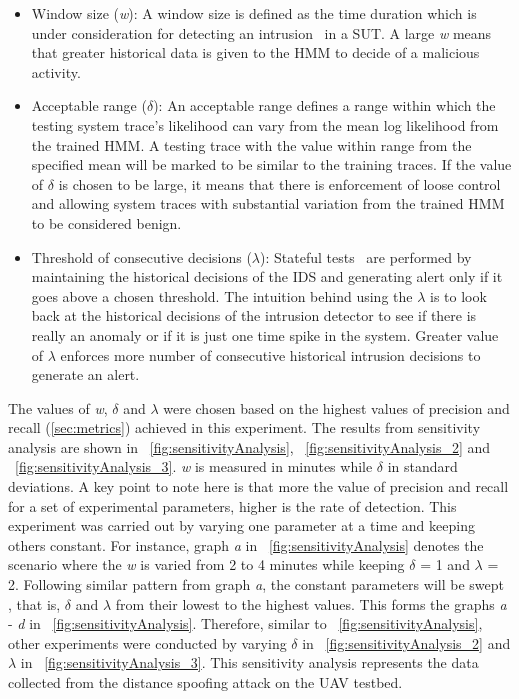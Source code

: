 \begin{itemize}
\item Window size (\textit{w}): A window size is defined as the time duration which is under consideration for detecting an intrusion~\cite{zohrevand2016hidden} in a \ac{SUT}. A large \textit{w} means that greater historical data is given to the \ac{HMM} to decide of a malicious activity.
\item Acceptable range ($\delta$): An acceptable range defines a range within which the testing system trace's likelihood can vary from the mean log likelihood from the trained \ac{HMM}. A testing trace with the value within range from the specified mean will be marked to be similar to the training traces. If the value of $\delta$ is chosen to be large, it means that there is enforcement of loose control and allowing system traces with substantial variation from the trained \ac{HMM} to be considered benign.
\item Threshold of consecutive decisions ($\lambda$): Stateful tests~\cite{urbina2016limiting} are performed by maintaining the historical decisions of the \ac{IDS} and generating alert only if it goes above a chosen threshold. The intuition behind using the $\lambda$ is to look back at the historical decisions of the intrusion detector to see if there is really an anomaly or if it is just one time spike in the system. Greater value of $\lambda$ enforces more number of consecutive historical intrusion decisions to generate an alert.
\end{itemize}

The values of \textit{w}, $\delta$ and $\lambda$ were chosen based on the highest values of precision and recall (\autoref{sec:metrics}) achieved in this experiment. The results from sensitivity analysis are shown in ~\autoref{fig:sensitivityAnalysis}, ~\autoref{fig:sensitivityAnalysis_2} and ~\autoref{fig:sensitivityAnalysis_3}. \textit{w} is measured in minutes while $\delta$ in standard deviations. A key point to note here is that more the value of precision and recall for a set of experimental parameters, higher is the rate of detection. This experiment was carried out by varying one parameter at a time and keeping others constant. For instance, graph \textit{a} in ~\autoref{fig:sensitivityAnalysis} denotes the scenario where the \textit{w} is varied from 2 to 4 minutes while keeping $\delta$ = 1 and $\lambda$ = 2. Following similar pattern from  graph \textit{a}, the constant parameters will be swept , that is, $\delta$ and $\lambda$ from their lowest to the highest values. This forms the graphs \textit{a} - \textit{d} in ~\autoref{fig:sensitivityAnalysis}. Therefore, similar to ~\autoref{fig:sensitivityAnalysis}, other experiments were conducted by varying $\delta$ in ~\autoref{fig:sensitivityAnalysis_2} and $\lambda$ in ~\autoref{fig:sensitivityAnalysis_3}. This sensitivity analysis represents the data collected from the distance spoofing attack on the \ac{UAV} testbed. 

